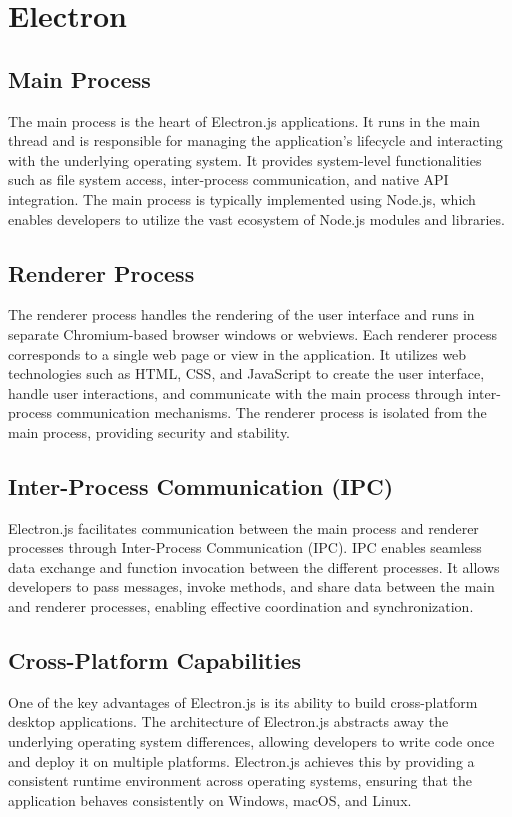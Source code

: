 \documentclass[a4paper, 11pt]{article}
\begin{document}
\section{Electron}

\subsection{Main Process}
The main process is the heart of Electron.js applications. It runs in the main thread and is responsible for managing the application's lifecycle and interacting with the underlying operating system. It provides system-level functionalities such as file system access, inter-process communication, and native API integration. The main process is typically implemented using Node.js, which enables developers to utilize the vast ecosystem of Node.js modules and libraries.

\subsection{Renderer Process}
The renderer process handles the rendering of the user interface and runs in separate Chromium-based browser windows or webviews. Each renderer process corresponds to a single web page or view in the application. It utilizes web technologies such as HTML, CSS, and JavaScript to create the user interface, handle user interactions, and communicate with the main process through inter-process communication mechanisms. The renderer process is isolated from the main process, providing security and stability.

\subsection{Inter-Process Communication (IPC)}
Electron.js facilitates communication between the main process and renderer processes through Inter-Process Communication (IPC). IPC enables seamless data exchange and function invocation between the different processes. It allows developers to pass messages, invoke methods, and share data between the main and renderer processes, enabling effective coordination and synchronization.

\subsection{Cross-Platform Capabilities}
One of the key advantages of Electron.js is its ability to build cross-platform desktop applications. The architecture of Electron.js abstracts away the underlying operating system differences, allowing developers to write code once and deploy it on multiple platforms. Electron.js achieves this by providing a consistent runtime environment across operating systems, ensuring that the application behaves consistently on Windows, macOS, and Linux.
\end{document}
